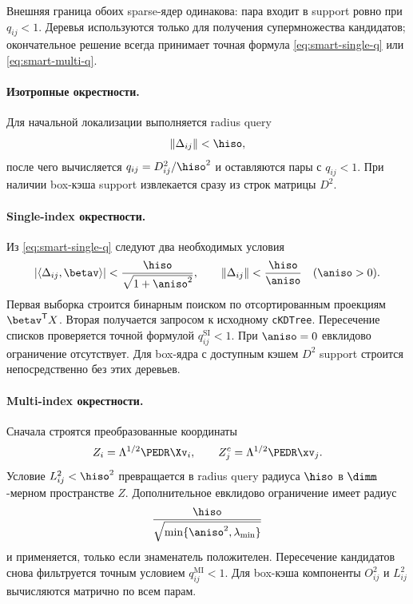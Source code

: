 Внешняя граница обоих sparse-ядер одинакова: пара входит в support
ровно при $q_{ij}<1$. Деревья используются только для получения
супермножества кандидатов; окончательное решение всегда принимает
точная формула \eqref{eq:smart-single-q} или
\eqref{eq:smart-multi-q}.

\paragraph{Изотропные окрестности.}
Для начальной локализации выполняется radius query
\begin{equation}
    \|\Delta_{ij}\|<\hiso,
\end{equation}
после чего вычисляется $q_{ij}=D_{ij}^2/\hiso^2$ и оставляются пары
с $q_{ij}<1$. При наличии box-кэша support извлекается сразу из строк
матрицы $D^2$.

\paragraph{Single-index окрестности.}
Из \eqref{eq:smart-single-q} следуют два необходимых условия
\begin{equation}
    |\langle\Delta_{ij},\betav\rangle|
    <\frac{\hiso}{\sqrt{1+\aniso^2}},
    \qquad
    \|\Delta_{ij}\|<\frac{\hiso}{\aniso}
    \quad(\aniso>0).
\label{eq:box-single-screens}
\end{equation}
Первая выборка строится бинарным поиском по отсортированным проекциям
$\betav^{\mathsf T}X$. Вторая получается запросом к исходному
\texttt{cKDTree}. Пересечение списков проверяется точной формулой
$q_{ij}^{\mathrm{SI}}<1$. При $\aniso=0$ евклидово ограничение
отсутствует. Для box-ядра с доступным кэшем $D^2$ support строится
непосредственно без этих деревьев.

\paragraph{Multi-index окрестности.}
Сначала строятся преобразованные координаты
\begin{equation}
    Z_i=\Lambda^{1/2}\PEDR\Xv_i,
    \qquad
    Z_j^c=\Lambda^{1/2}\PEDR\xv_j.
\end{equation}
Условие $L_{ij}^2<\hiso^2$ превращается в radius query радиуса
$\hiso$ в $\dimm$-мерном пространстве $Z$. Дополнительное евклидово
ограничение имеет радиус
\begin{equation}
    \frac{\hiso}{
        \sqrt{\min\{\aniso^2,\lambda_{\min}\}}
    }
\end{equation}
и применяется, только если знаменатель положителен. Пересечение
кандидатов снова фильтруется точным условием
$q_{ij}^{\mathrm{MI}}<1$. Для box-кэша компоненты
$O_{ij}^2$ и $L_{ij}^2$ вычисляются матрично по всем парам.

